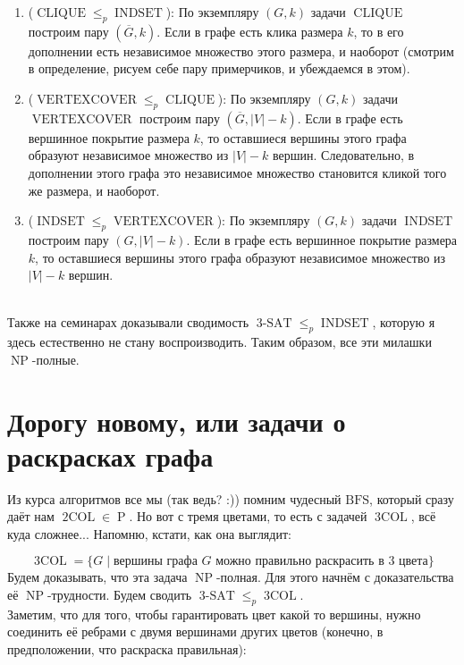 \documentclass[11pt]{article}
\DeclareMathOperator{\tSAT}{3-SAT}
\DeclareMathOperator{\tCOL}{2COL}
\DeclareMathOperator{\trCOL}{3COL}
\DeclareMathOperator{\VERTEXCOVER}{VERTEXCOVER}
\DeclareMathOperator{\CLIQUE}{CLIQUE}
\DeclareMathOperator{\INDSET}{INDSET}
\DeclareMathOperator{\Poly}{P}
\DeclareMathOperator{\NP}{NP}
\begin{document}
\begin{enumerate}
    \item ($\CLIQUE \leq_{p} \INDSET$): По экземпляру $(G, k)$ задачи $\CLIQUE$ построим пару $(\overline{G}, k)$. Если в графе есть клика размера $k$, то в его дополнении есть независимое множество этого размера, и наоборот (смотрим в определение, рисуем себе пару примерчиков, и убеждаемся в этом).
    \item ($\VERTEXCOVER \leq_{p} \CLIQUE$): По экземпляру $(G, k)$ задачи $\VERTEXCOVER$ построим пару $(\overline{G}, \left\lvert V \right\rvert - k)$. Если в графе есть вершинное покрытие размера $k$, то оставшиеся вершины этого графа образуют независимое множество из $\left\lvert V \right\rvert - k$ вершин. Следовательно, в дополнении этого графа это независимое множество становится кликой того же размера, и наоборот.
    \item ($\INDSET \leq_{p} \VERTEXCOVER$): По экземпляру $(G, k)$ задачи $\INDSET$ построим пару $(G, \left\lvert V \right\rvert - k)$. Если в графе есть вершинное покрытие размера $k$, то оставшиеся вершины этого графа образуют независимое множество из $\left\lvert V \right\rvert - k$ вершин.
\end{enumerate} \leavevmode
\\
Также на семинарах доказывали сводимость $\tSAT \leq_{p} \INDSET$, которую я здесь естественно не стану воспроизводить. Таким образом, все эти милашки $\NP$-полные.

\section{Дорогу новому, или задачи о раскрасках графа}

Из курса алгоритмов все мы (так ведь? :)) помним чудесный $\text{BFS}$, который сразу даёт нам $\tCOL \in \Poly$. Но вот с тремя цветами, то есть с задачей $\trCOL$, всё куда сложнее... Напомню, кстати, как она выглядит:

\[\trCOL = \{G \; | \; \text{вершины графа } G \text{ можно правильно раскрасить в } 3 \text{ цвета}\}\]
Будем доказывать, что эта задача $\NP$-полная. Для этого начнём с доказательства её $\NP$-трудности. Будем сводить $\tSAT \leq_{p} \trCOL$. \\
Заметим, что для того, чтобы гарантировать цвет какой то вершины, нужно соединить её ребрами с двумя вершинами других цветов (конечно, в предположении, что раскраска правильная):
\end{document}
